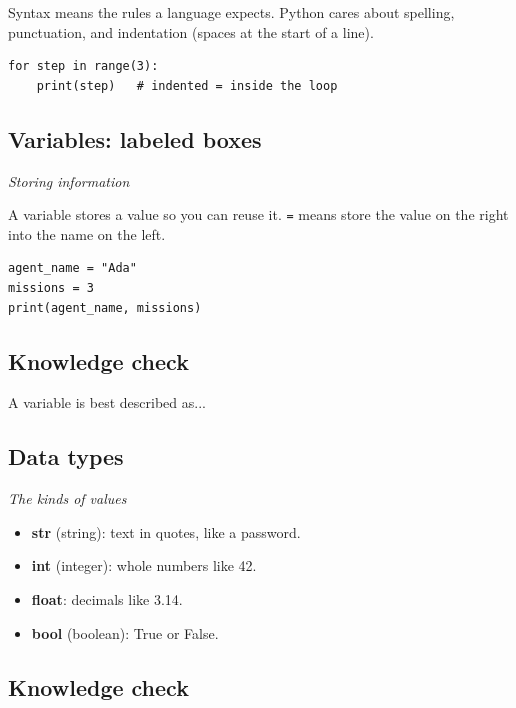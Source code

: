 \documentclass[12pt,openany]{book}
\begin{document}
Syntax means the rules a language expects. Python cares about spelling, punctuation, and indentation (spaces at the start of a line).

\begin{lstlisting}
for step in range(3):
    print(step)   # indented = inside the loop\end{lstlisting}

\medskip

\subsection*{Variables: labeled boxes}
{\small\itshape\color{gray}Storing information}


A variable stores a value so you can reuse it. \texttt{=} means store the value on the right into the name on the left.

\begin{lstlisting}
agent_name = "Ada"
missions = 3
print(agent_name, missions)\end{lstlisting}

\medskip

\subsection*{Knowledge check}

A variable is best described as...

\medskip

\subsection*{Data types}
{\small\itshape\color{gray}The kinds of values}


\begin{itemize}
  \item \textbf{str} (string): text in quotes, like a password.
  \item \textbf{int} (integer): whole numbers like 42.
  \item \textbf{float}: decimals like 3.14.
  \item \textbf{bool} (boolean): True or False.
\end{itemize}

\medskip

\subsection*{Knowledge check}
\end{document}
